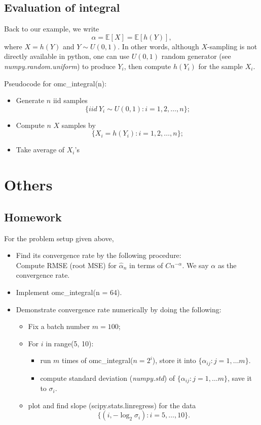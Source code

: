 \documentclass{article}
\begin{document}
\subsection{Evaluation of integral}
Back to our example, we write
$$\alpha = \mathbb E[X] = \mathbb E[h(Y)],$$
where $X = h(Y)$ and $Y\sim U(0,1)$.
In other words, although $X$-sampling is not directly available in python, 
one can use $U(0,1)$ random generator (see {\it numpy.random.uniform}) to produce $Y_i$, then compute $h(Y_i)$ for 
the sample $X_i$.

Pseudocode for omc\_integral(n):
\begin{itemize}
\item Generate $n$ iid samples $$\{iid \ Y_i\sim U(0,1): i = 1, 2, \ldots, n\};$$
\item Compute $n$ $X$ samples by
$$\{X_i = h(Y_i): i = 1, 2, \ldots, n\};$$
\item Take average of $X_i$'s
\end{itemize}

\section{Others}
\subsection{Homework}
 For the problem setup given above, 
\begin{itemize}
 \item Find its convergence rate by the following procedure: \\
 Compute RMSE (root MSE) for $\hat \alpha_n$ in terms of $C n^{-\alpha}$.
 We say $\alpha$ as the convergence rate.
 \item Implement omc\_integral(n = 64).
 \item Demonstrate convergence rate numerically by doing the following:
\begin{itemize}
 \item Fix a batch number $m=100$;
 \item For $i$ in range(5, 10): 
\begin{itemize}
 \item run  $m$ times of omc\_integral($n=2^i$), store it into $\{\alpha_{ij}: j = 1, \ldots m\}.$
 \item compute standard deviation ({\it numpy.std}) of $\{\alpha_{ij}: j = 1, \ldots m\}$, save it to $\sigma_i$.
\end{itemize}
\item plot and find slope (scipy.stats.linregress)  for the data
$$\{(i, -\log_2 \sigma_i): i = 5, \ldots, 10\}.$$
\end{itemize}

\end{itemize}
\end{document}
